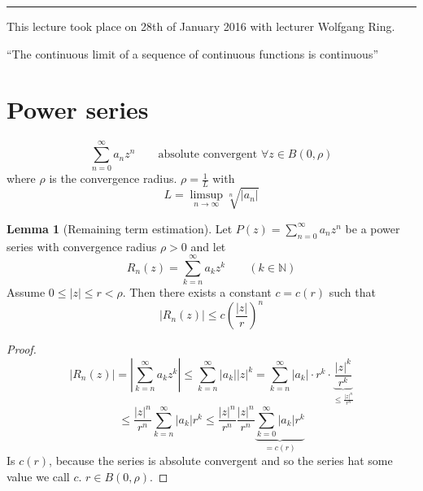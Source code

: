 \documentclass[a4paper,landscape,twocolumn]{article}
\theoremstyle{definition}
\newtheorem{lemma}{Lemma}
\newcommand\abs[1]{\left|#1\right|}
\newcommand\meta[3]{\hrule{} This #1 took place on #2 with lecturer #3.\par}
\begin{document}
\meta{lecture}{28th of January 2016}{Wolfgang Ring}

\begin{center}
  \enquote{The continuous limit of a sequence of continuous functions is continuous}
\end{center}

\section{Power series}

\[ \sum_{n=0}^\infty a_n z^n \qquad \text{absolute convergent } \forall z \in B(0,\rho) \]
where $\rho$ is the convergence radius. $\rho = \frac1L$ with
\[ L = \limsup_{n\to\infty} \sqrt[n]{\abs{a_n}} \]

\begin{lemma}[Remaining term estimation] %
  Let $P(z) = \sum_{n=0}^\infty a_n z^n$ be a power series with convergence radius
  $\rho > 0$ and let
  \[ R_n(z) = \sum_{k=n}^\infty a_k z^k \qquad (k \in \mathbb N) \]
  Assume $0 \leq \abs{z} \leq r < \rho$. Then there exists a constant $c = c(r)$
  such that
  \[ \abs{R_n(z)} \leq c \left(\frac{\abs{z}}{r}\right)^n \]
\end{lemma}
\begin{proof}
  \[
    \abs{R_n(z)}
    = \abs{\sum_{k=n}^\infty a_k z^k} \leq \sum_{k=n}^\infty \abs{a_k} \abs{z}^k
    = \sum_{k=n}^\infty \abs{a_k} \cdot r^k \cdot \underbrace{\frac{\abs{z}^k}{r^k}}_{\leq \frac{\abs{z}^n}{r^n}}
  \] \[
    \leq \frac{\abs{z}^n}{r^n} \sum_{k=n}^\infty \abs{a_k} r^k
    \leq \frac{\abs{z}^n}{r^n} \frac{\abs{z}^n}{r^n} \underbrace{\sum_{k=0}^\infty \abs{a_k} r^k}_{= c(r)}
  \]
  Is $c(r)$, because the series is absolute convergent and so the series hat some value
  we call $c$. $r \in B(0, \rho)$.
\end{proof}
\end{document}
